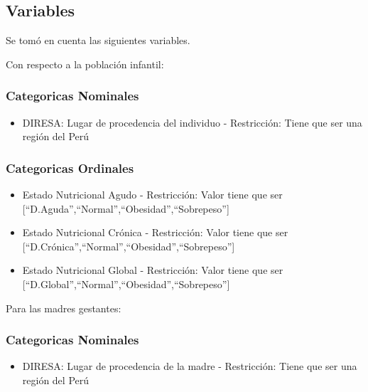 \documentclass[
]{article}
\providecommand{\tightlist}{%
  \setlength{\itemsep}{0pt}\setlength{\parskip}{0pt}}
\begin{document}
\hypertarget{variables}{%
\subsection{Variables}\label{variables}}

Se tomó en cuenta las siguientes variables.

Con respecto a la población infantil:

\hypertarget{categoricas-nominales}{%
\subsubsection{Categoricas Nominales}\label{categoricas-nominales}}

\begin{itemize}
\tightlist
\item
  DIRESA: Lugar de procedencia del individuo - Restricción: Tiene que
  ser una región del Perú
\end{itemize}

\hypertarget{categoricas-ordinales}{%
\subsubsection{Categoricas Ordinales}\label{categoricas-ordinales}}

\begin{itemize}
\tightlist
\item
  Estado Nutricional Agudo - Restricción: Valor tiene que ser
  {[}``D.Aguda'',``Normal'',``Obesidad'',``Sobrepeso''{]}
\item
  Estado Nutricional Crónica - Restricción: Valor tiene que ser
  {[}``D.Crónica'',``Normal'',``Obesidad'',``Sobrepeso''{]}
\item
  Estado Nutricional Global - Restricción: Valor tiene que ser
  {[}``D.Global'',``Normal'',``Obesidad'',``Sobrepeso''{]}
\end{itemize}

Para las madres gestantes:

\hypertarget{categoricas-nominales-1}{%
\subsubsection{Categoricas Nominales}\label{categoricas-nominales-1}}

\begin{itemize}
\tightlist
\item
  DIRESA: Lugar de procedencia de la madre - Restricción: Tiene que ser
  una región del Perú
\end{itemize}
\end{document}
